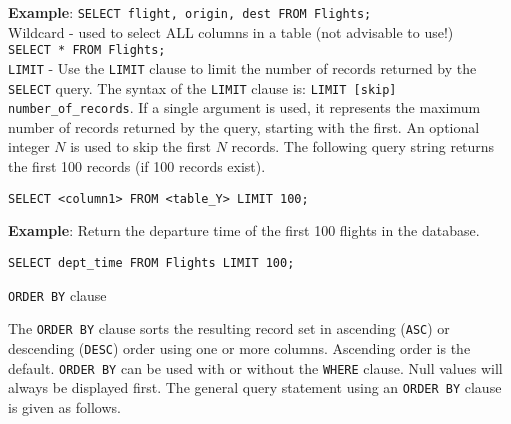 \documentclass{article}
\begin{document}
\begin{outline}
               
    \textbf{Example}: \texttt{SELECT flight, origin, dest FROM Flights;}\\
               
                            
                 
             \1 Wildcard - used to select ALL columns in a table (not advisable
to use!)\\

 \texttt{SELECT * FROM Flights;} \\
                













                
           \1 \texttt{LIMIT} - Use the \texttt{LIMIT}  clause to limit the number of records returned by the \texttt{SELECT} query.  The syntax of the \texttt{LIMIT} clause is:  \texttt{LIMIT [skip] number\_of\_records}.  If a single argument is used, it represents the maximum number of records returned by the query, starting with the first.  An optional integer $N$ is used to skip the first $N$ records.  The following query string returns the first 100 records (if 100 records exist).  


\begin{lstlisting}[belowskip=-1.5 \baselineskip]  
SELECT <column1> FROM <table_Y> LIMIT 100;
\end{lstlisting} 
% 
% 
% 

\textbf{Example}: Return the departure time of the first 100 flights in the database.

\texttt{SELECT dept\_time FROM Flights LIMIT 100;}













         \1 \texttt{ORDER BY} clause
         
         The \texttt{ORDER BY} clause sorts the resulting record set in ascending (\texttt{ASC}) or descending (\texttt{DESC}) order using one or more columns.  Ascending order is the default.  \texttt{ORDER BY}  can be used with or without the \texttt{WHERE} clause.  Null values will always be displayed first.  The general query statement using an \texttt{ORDER BY} clause is given as follows. \\



\end{outline}
\end{document}
